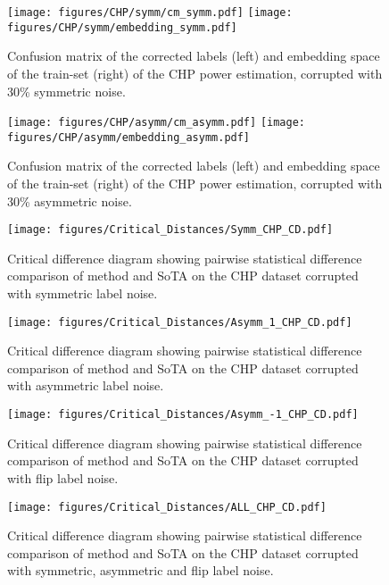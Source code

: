 \documentclass{llncs}
\begin{document}
\begin{figure}[th]
    \centering
    \texttt{[image: figures/CHP/symm/cm\_symm.pdf]}\:
    \centering
    \texttt{[image: figures/CHP/symm/embedding\_symm.pdf]}
    \caption{Confusion matrix of the corrected labels (left) and embedding space of the train-set (right) of the CHP power estimation, corrupted with 30\% symmetric noise.}
    \label{fig:cm_umap_symm}
\end{figure}


\begin{figure}[th]
    \centering
    \texttt{[image: figures/CHP/asymm/cm\_asymm.pdf]}\:
    \centering
    \texttt{[image: figures/CHP/asymm/embedding\_asymm.pdf]}
    \caption{Confusion matrix of the corrected labels (left) and embedding space of the train-set (right) of the CHP power estimation, corrupted with 30\% asymmetric noise.}
    \label{fig:cm_umap_asymm}
\end{figure}



\begin{figure}[th]
    \centering
    \texttt{[image: figures/Critical\_Distances/Symm\_CHP\_CD.pdf]}
    \caption{Critical difference diagram showing pairwise statistical difference comparison of \acrshort{method} and SoTA on the CHP dataset corrupted with symmetric label noise.}
    \label{fig:CHP_CD_symm}
\end{figure}

\begin{figure}[th]
    \centering
    \texttt{[image: figures/Critical\_Distances/Asymm\_1\_CHP\_CD.pdf]}
    \caption{Critical difference diagram showing pairwise statistical difference comparison of \acrshort{method} and SoTA on the CHP dataset corrupted with asymmetric label noise.}
    \label{fig:CHP_CD_asymm}
\end{figure}

\begin{figure}[th]
    \centering
    \texttt{[image: figures/Critical\_Distances/Asymm\_-1\_CHP\_CD.pdf]}
    \caption{Critical difference diagram showing pairwise statistical difference comparison of \acrshort{method} and SoTA on the CHP dataset corrupted with flip label noise.}
    \label{fig:CHP_CD_flip}
\end{figure}

\begin{figure}[th]
    \centering
    \texttt{[image: figures/Critical\_Distances/ALL\_CHP\_CD.pdf]}
    \caption{Critical difference diagram showing pairwise statistical difference comparison of \acrshort{method} and SoTA on the CHP dataset corrupted with symmetric, asymmetric and flip label noise.}
    \label{fig:CHP_CD}
\end{figure}
\end{document}
